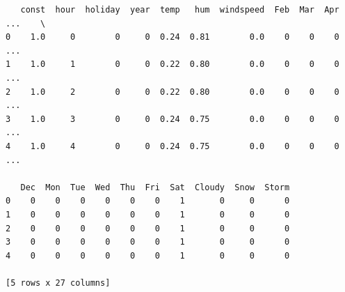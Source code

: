 \documentclass[11pt]{article}
\begin{document}
    
    \begin{verbatim}
   const  hour  holiday  year  temp   hum  windspeed  Feb  Mar  Apr  ...    \
0    1.0     0        0     0  0.24  0.81        0.0    0    0    0  ...     
1    1.0     1        0     0  0.22  0.80        0.0    0    0    0  ...     
2    1.0     2        0     0  0.22  0.80        0.0    0    0    0  ...     
3    1.0     3        0     0  0.24  0.75        0.0    0    0    0  ...     
4    1.0     4        0     0  0.24  0.75        0.0    0    0    0  ...     

   Dec  Mon  Tue  Wed  Thu  Fri  Sat  Cloudy  Snow  Storm  
0    0    0    0    0    0    0    1       0     0      0  
1    0    0    0    0    0    0    1       0     0      0  
2    0    0    0    0    0    0    1       0     0      0  
3    0    0    0    0    0    0    1       0     0      0  
4    0    0    0    0    0    0    1       0     0      0  

[5 rows x 27 columns]
    \end{verbatim}
\end{document}
